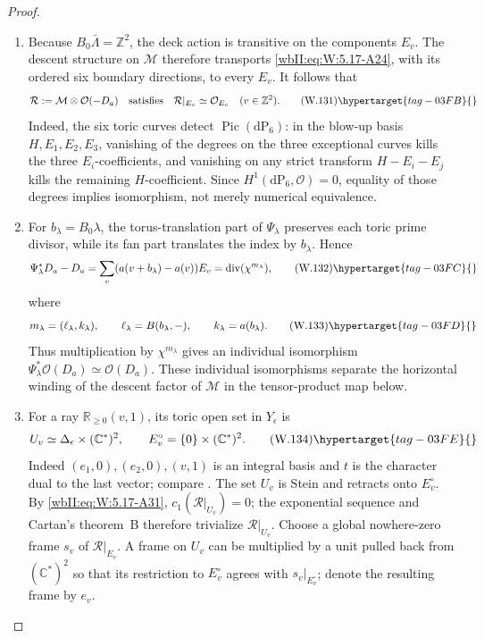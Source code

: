 \begin{proof}
\begin{enumerate}[label=\arabic*.,leftmargin=*]
\item Because \(B_0\bar\Lambda=\mathbb Z^2\), the deck action is transitive on
the components \(E_v\).  The descent structure on \(\mathcal M\)
therefore transports \eqref{wbII:eq:W:5.17-A24}, with its ordered six boundary directions,
to every \(E_v\).  It follows that
\[
 \mathcal R:=\mathcal M\otimes\mathcal O(-D_a)
 \quad\text{satisfies}\quad
 \mathcal R|_{E_v}\simeq\mathcal O_{E_v}
 \quad(v\in\mathbb Z^2).
\tag{W.131}\hypertarget{tag-03FB}{}\label{wbII:eq:W:5.17-A31}
\]
Indeed, the six toric curves detect \(\operatorname{Pic}(\mathrm{dP}_6)\):
in the blow-up basis \(H,E_1,E_2,E_3\), vanishing of the degrees on the
three exceptional curves kills the three \(E_i\)-coefficients, and
vanishing on any strict transform \(H-E_i-E_j\) kills the remaining
\(H\)-coefficient.  Since
\(H^1(\mathrm{dP}_6,\mathcal O)=0\), equality of those degrees implies
isomorphism, not merely numerical equivalence.

\item For \(b_\lambda=B_0\lambda\), the torus-translation part of
\(\Psi_\lambda\) preserves each toric prime divisor, while its fan part
translates the index by \(b_\lambda\).  Hence
\[
 \Psi_\lambda^*D_a-D_a
 =\sum_v(a(v+b_\lambda)-a(v))E_v
 =\operatorname{div}(\chi^{m_\lambda}),
\tag{W.132}\hypertarget{tag-03FC}{}\label{wbII:eq:W:5.17-A32}
\]
where
\[
 m_\lambda=(\ell_\lambda,k_\lambda),
 \qquad
 \ell_\lambda=B(b_\lambda,-),
 \qquad
 k_\lambda=a(b_\lambda).
\tag{W.133}\hypertarget{tag-03FD}{}\label{wbII:eq:W:5.17-A33}
\]
Thus multiplication by \(\chi^{m_\lambda}\) gives an individual
isomorphism
\(\Psi_\lambda^*\mathcal O(D_a)\simeq\mathcal O(D_a)\).
These individual isomorphisms separate the horizontal winding of the
descent factor of $\mathcal M$ in the tensor-product map below.

\item For a ray \(\mathbb R_{\ge0}(v,1)\), its toric open set in
\(Y_\epsilon\) is
\[
 U_v\simeq\Delta_\epsilon\times(\mathbb C^*)^2,
 \qquad E_v^\circ=\{0\}\times(\mathbb C^*)^2.
\tag{W.134}\hypertarget{tag-03FE}{}\label{wbII:eq:W:5.17-A34}
\]
Indeed \((e_1,0),(e_2,0),(v,1)\) is an integral basis and \(t\) is the
character dual to the last vector; compare
\cite[2010 text, Example~1.2.21, p.~31]{CoxLittleSchenck2011}.
The set \(U_v\) is Stein and retracts
onto \(E_v^\circ\).  By \eqref{wbII:eq:W:5.17-A31},
\(c_1(\mathcal R|_{U_v})=0\); the exponential sequence and Cartan's
theorem~B therefore trivialize \(\mathcal R|_{U_v}\).  Choose a global
nowhere-zero frame \(s_v\) of \(\mathcal R|_{E_v}\).  A frame on \(U_v\) can be
multiplied by a unit pulled back from \((\mathbb C^*)^2\) so that its
restriction to \(E_v^\circ\) agrees with \(s_v|_{E_v^\circ}\); denote the
resulting frame by \(e_v\).


\end{enumerate}
\end{proof}
